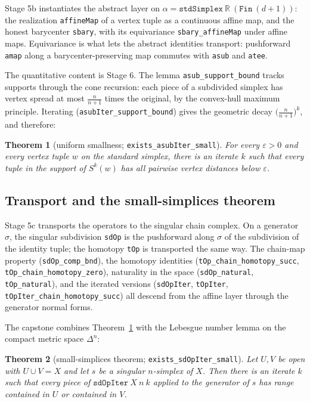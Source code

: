 \documentclass[11pt]{article}
\newtheorem{theorem}{Theorem}[section]
\theoremstyle{remark}
\newcommand{\R}{\mathbb{R}}
\newcommand{\leanname}[1]{\texttt{#1}}
\begin{document}
Stage 5b instantiates the abstract layer on
$\alpha = \leanname{stdSimplex}\ \R\ (\leanname{Fin}\ (d+1))$: the
realization \leanname{affineMap} of a vertex tuple as a continuous affine
map, and the honest barycenter \leanname{sbary}, with its equivariance
\leanname{sbary\_affineMap} under affine maps. Equivariance is what lets
the abstract identities transport: pushforward \leanname{amap} along a
barycenter-preserving map commutes with \leanname{asub} and
\leanname{atee}.

The quantitative content is Stage 6. The lemma
\leanname{asub\_support\_bound} tracks supports through the cone recursion:
each piece of a subdivided simplex has vertex spread at most
$\tfrac{n}{n+1}$ times the original, by the convex-hull maximum principle.
Iterating
(\leanname{asubIter\_support\_bound}) gives the geometric decay
$\bigl(\tfrac{n}{n+1}\bigr)^k$, and therefore:

\begin{theorem}[uniform smallness; \leanname{exists\_asubIter\_small}]
\label{thm:small-affine}
For every $\varepsilon > 0$ and every vertex tuple $w$ on the standard
simplex, there is an iterate $k$ such that every tuple in the support of
$S^k(w)$ has all pairwise vertex distances below $\varepsilon$.
\end{theorem}

\subsection{Transport and the small-simplices theorem}

Stage 5c transports the operators to the singular chain complex. On a
generator $\sigma$, the singular subdivision \leanname{sdOp} is the
pushforward along $\sigma$ of the subdivision of the identity tuple; the
homotopy \leanname{tOp} is transported the same way. The chain-map property
(\leanname{sdOp\_comp\_bnd}), the homotopy identities
(\leanname{tOp\_chain\_homotopy\_succ}, \leanname{tOp\_chain\_homotopy\_zero}),
naturality in the space (\leanname{sdOp\_natural}, \leanname{tOp\_natural}),
and the iterated versions (\leanname{sdOpIter}, \leanname{tOpIter},
\leanname{tOpIter\_chain\_homotopy\_succ}) all descend from the affine layer
through the generator normal forms.

The capstone combines Theorem~\ref{thm:small-affine} with the Lebesgue
number lemma on the compact metric space $\Delta^n$:

\begin{theorem}[small-simplices theorem; \leanname{exists\_sdOpIter\_small}]
\label{thm:small-simplices}
Let $U, V$ be open with $U \cup V = X$ and let $s$ be a singular
$n$-simplex of $X$. Then there is an iterate $k$ such that every piece of
$\leanname{sdOpIter}\ X\ n\ k$ applied to the generator of $s$ has range
contained in $U$ or contained in $V$.
\end{theorem}
\end{document}
